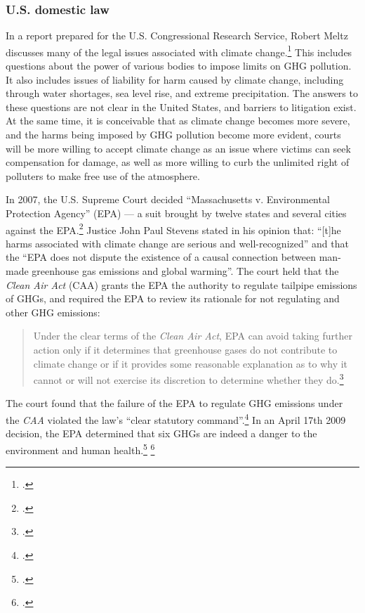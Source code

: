 \documentclass[10pt]{article}
\begin{document}
		\subsubsection{U.S. domestic law}
		\label{sec:USDomesticLaw}



In a report prepared for the U.S. Congressional Research Service, Robert Meltz discusses many of the legal issues associated with climate change.\footcite[][]{ExistingLaw}
This includes questions about the power of various bodies to impose limits on GHG pollution.
It also includes issues of liability for harm caused by climate change, including through water shortages, sea level rise, and extreme precipitation.
The answers to these questions are not clear in the United States, and barriers to litigation exist.
At the same time, it is conceivable that as climate change becomes more severe, and the harms being imposed by GHG pollution become more evident, courts will be more willing to accept climate change as an issue where victims can seek compensation for damage, as well as more willing to curb the unlimited right of polluters to make free use of the atmosphere.



In 2007, the U.S. Supreme Court decided ``Massachusetts v. Environmental Protection Agency'' (EPA) --- a suit brought by twelve states and several cities against the EPA.\footcite[][]{MassVEPA}
Justice John Paul Stevens stated in his opinion that: ``[t]he harms associated with climate change are serious and well-recognized'' and that the ``EPA does not dispute the existence of a causal connection between man-made greenhouse gas emissions and global warming''.
The court held that the \emph{Clean Air Act} (CAA) grants the EPA the authority to regulate tailpipe emissions of GHGs, and required the EPA to review its rationale for not regulating  and other GHG emissions:
\begin{quote}
Under the clear terms of the \emph{Clean Air Act}, EPA can avoid taking further action only if it determines that greenhouse gases do not contribute to climate change or if it provides some reasonable explanation as to why it cannot or will not exercise its discretion to determine whether they do.\footcite[][p. 30]{MassVEPA}
\end{quote}
The court found that the failure of the EPA to regulate GHG emissions under the \emph{CAA} violated the law's ``clear statutory command''.\footcite[See: ][]{EPAhaspower}
In an April 17th 2009 decision, the EPA determined that six GHGs are indeed a danger to the environment and human health.\footcite[][]{EPAEndangermentFinding} \footcite[][]{GreenFigleaf}
\end{document}
